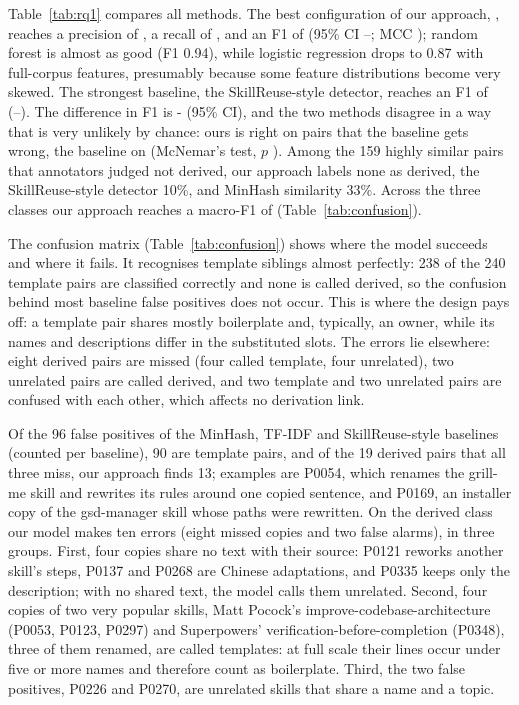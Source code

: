 \documentclass[sigconf,screen]{acmart}
\begin{document}
\begin{table}[t]
\caption{RQ1: confusion matrix of our best model (out-of-fold).}
\label{tab:confusion}
\small
{}
\end{table}

Table~\ref{tab:rq1} compares all methods. The best configuration of our approach, \ResOursName{}, reaches a precision of \ResOursP{}, a recall of \ResOursR{}, and an F1 of \ResOursF{} (95\% CI \ResOursFLo--\ResOursFHi; MCC \ResOursMCC{}); random forest is almost as good (F1 0.94), while logistic regression drops to 0.87 with full-corpus features, presumably because some feature distributions become very skewed. The strongest baseline, the SkillReuse-style detector, reaches an F1 of \ResBaseF{} (\ResBaseFLo--\ResBaseFHi). The difference in F1 is \ResDiffFLo-\ResDiffFHi{} (95\% CI), and the two methods disagree in a way that is very unlikely by chance: ours is right on \ResMcNemarOnlyOurs{} pairs that the baseline gets wrong, the baseline on \ResMcNemarOnlyBase{} (McNemar's test, $p$ \ResMcNemarP{}). Among the 159 highly similar pairs that annotators judged not derived, our approach labels none as derived, the SkillReuse-style detector 10\%, and MinHash similarity 33\%. Across the three classes our approach reaches a macro-F1 of \ResMacroF{} (Table~\ref{tab:confusion}).

The confusion matrix (Table~\ref{tab:confusion}) shows where the model succeeds and where it fails. It recognises template siblings almost perfectly: 238 of the 240 template pairs are classified correctly and none is called derived, so the confusion behind most baseline false positives does not occur. This is where the design pays off: a template pair shares mostly boilerplate and, typically, an owner, while its names and descriptions differ in the substituted slots. The errors lie elsewhere: eight derived pairs are missed (four called template, four unrelated), two unrelated pairs are called derived, and two template and two unrelated pairs are confused with each other, which affects no derivation link.

Of the 96 false positives of the MinHash, TF-IDF and SkillReuse-style baselines (counted per baseline), 90 are template pairs, and of the 19 derived pairs that all three miss, our approach finds 13; examples are P0054, which renames the grill-me skill and rewrites its rules around one copied sentence, and P0169, an installer copy of the gsd-manager skill whose paths were rewritten. On the derived class our model makes ten errors (eight missed copies and two false alarms), in three groups. First, four copies share no text with their source: P0121 reworks another skill's steps, P0137 and P0268 are Chinese adaptations, and P0335 keeps only the description; with no shared text, the model calls them unrelated. Second, four copies of two very popular skills, Matt Pocock's improve-codebase-architecture (P0053, P0123, P0297) and Superpowers' verification-before-completion (P0348), three of them renamed, are called templates: at full scale their lines occur under five or more names and therefore count as boilerplate. Third, the two false positives, P0226 and P0270, are unrelated skills that share a name and a topic.
\end{document}
